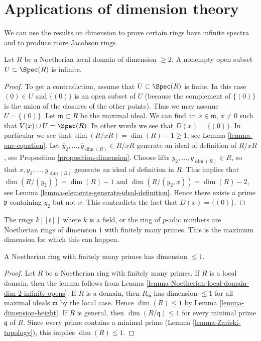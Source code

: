 \section{Applications of dimension theory}
\label{section-applications-dimension-theory}

\noindent
We can use the results on dimension to prove certain rings
have infinite spectra and to produce more Jacobson rings.

\begin{lemma}
\label{lemma-Noetherian-local-domain-dim-2-infinite-opens}
Let $R$ be a Noetherian local domain of dimension $\geq 2$.
A nonempty open subset $U \subset \Spec(R)$ is
infinite.
\end{lemma}

\begin{proof}
To get a contradiction, assume that $U \subset \Spec(R)$ is finite.
In this case $(0) \in U$ and $\{(0)\}$ is an open subset of $U$ (because
the complement of $\{(0)\}$ is the union of the closures of the other points).
Thus we may assume $U = \{(0)\}$.
Let $\mathfrak m \subset R$ be the maximal ideal.
We can find an $x \in \mathfrak m$, $x \not = 0$ such that
$V(x) \cup U = \Spec(R)$. In other words we see that
$D(x) = \{(0)\}$. In particular we see
that $\dim(R/xR) = \dim(R) - 1 \geq 1$, see Lemma \ref{lemma-one-equation}.
Let $\overline{y}_2, \ldots, \overline{y}_{\dim(R)} \in R/xR$ generate
an ideal of definition of $R/xR$, see Proposition \ref{proposition-dimension}.
Choose lifts $y_2, \ldots, y_{\dim(R)} \in R$, so that
$x, y_2, \ldots, y_{\dim(R)}$ generate an ideal of definition in $R$.
This implies that $\dim(R/(y_2)) = \dim(R) - 1$ and
$\dim(R/(y_2, x)) = \dim(R) - 2$, see
Lemma \ref{lemma-elements-generate-ideal-definition}.
Hence there exists a prime
$\mathfrak p$ containing $y_2$ but not $x$. This contradicts
the fact that $D(x) = \{(0)\}$.
\end{proof}

\noindent
The rings $k[[t]]$ where $k$ is a field, or the ring of $p$-adic
numbers are Noetherian rings of dimension $1$ with finitely many primes.
This is the maximum dimension for which this can happen.

\begin{lemma}
\label{lemma-Noetherian-finite-nr-primes}
A Noetherian ring with finitely many primes has dimension $\leq 1$.
\end{lemma}

\begin{proof}
Let $R$ be a Noetherian ring with finitely many primes.
If $R$ is a local domain, then the lemma follows from
Lemma \ref{lemma-Noetherian-local-domain-dim-2-infinite-opens}.
If $R$ is a domain, then $R_\mathfrak m$ has dimension $\leq 1$
for all maximal ideals $\mathfrak m$ by the local case.
Hence $\dim(R) \leq 1$ by Lemma \ref{lemma-dimension-height}.
If $R$ is general, then $\dim(R/\mathfrak q) \leq 1$
for every minimal prime $\mathfrak q$ of $R$.
Since every prime contains a minimal prime
(Lemma \ref{lemma-Zariski-topology}), this implies $\dim(R) \leq 1$.
\end{proof}

